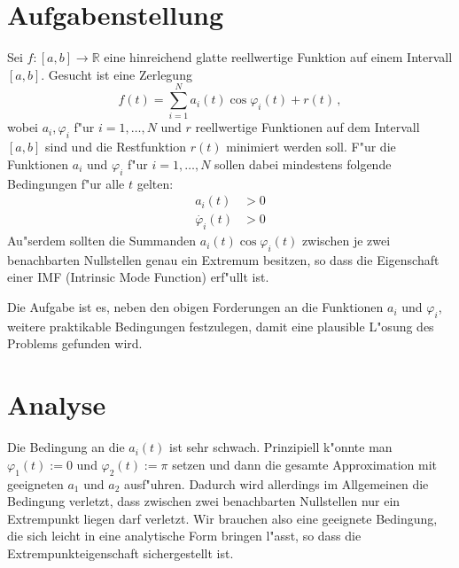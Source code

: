 \documentclass{scrartcl}
\newcommand{\R}{{\mathbb{R}}}
\begin{document}
\tableofcontents

\section{Aufgabenstellung}

Sei $f:[a,b]\to\R$ eine hinreichend glatte reellwertige Funktion auf einem Intervall $[a,b]$. Gesucht ist eine Zerlegung
$$ f(t) = \sum_{i=1}^N a_i(t)\cos\varphi_i(t) + r(t)\,, $$
wobei $a_i,\varphi_i$ f"ur $i=1,\dotsc,N$ und $r$ reellwertige Funktionen auf dem Intervall $[a,b]$ sind und die Restfunktion $r(t)$ minimiert werden soll. F"ur die Funktionen $a_i$ und $\varphi_i$ f"ur $i=1,\dotsc,N$ sollen dabei mindestens folgende Bedingungen f"ur alle $t$ gelten:
\begin{align*}
  a_i(t) &> 0 \\
  \dot{\varphi_i}(t) &> 0
\end{align*}
Au"serdem sollten die Summanden $a_i(t)\cos\varphi_i(t)$ zwischen je zwei benachbarten Nullstellen genau ein Extremum besitzen, so dass die Eigenschaft einer IMF (Intrinsic Mode Function) erf"ullt ist.

Die Aufgabe ist es, neben den obigen Forderungen an die Funktionen $a_i$ und $\varphi_i$, weitere praktikable Bedingungen festzulegen, damit eine plausible L"osung des Problems gefunden wird. 


\section{Analyse}

Die Bedingung an die $a_i(t)$ ist sehr schwach. Prinzipiell k"onnte man $\varphi_1(t):=0$ und $\varphi_2(t):=\pi$ setzen und dann die gesamte Approximation mit geeigneten $a_1$ und $a_2$ ausf"uhren. Dadurch wird allerdings im Allgemeinen die Bedingung verletzt, dass zwischen zwei benachbarten Nullstellen nur ein Extrempunkt liegen darf verletzt. Wir brauchen also eine geeignete Bedingung, die sich leicht in eine analytische Form bringen l"asst, so dass die Extrempunkteigenschaft sichergestellt ist. 
\end{document}
